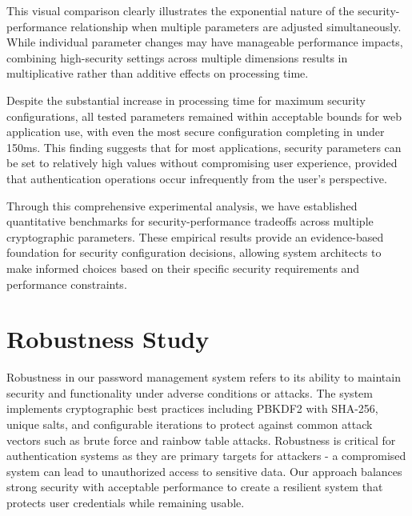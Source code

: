 \documentclass[11pt,a4paper]{article}
\begin{document}
This visual comparison clearly illustrates the exponential nature of the security-performance relationship when multiple parameters are adjusted simultaneously. While individual parameter changes may have manageable performance impacts, combining high-security settings across multiple dimensions results in multiplicative rather than additive effects on processing time.

Despite the substantial increase in processing time for maximum security configurations, all tested parameters remained within acceptable bounds for web application use, with even the most secure configuration completing in under 150ms. This finding suggests that for most applications, security parameters can be set to relatively high values without compromising user experience, provided that authentication operations occur infrequently from the user's perspective.

Through this comprehensive experimental analysis, we have established quantitative benchmarks for security-performance tradeoffs across multiple cryptographic parameters. These empirical results provide an evidence-based foundation for security configuration decisions, allowing system architects to make informed choices based on their specific security requirements and performance constraints.

\section{Robustness Study}

Robustness in our password management system refers to its ability to maintain security and functionality under adverse conditions or attacks. The system implements cryptographic best practices including PBKDF2 with SHA-256, unique salts, and configurable iterations to protect against common attack vectors such as brute force and rainbow table attacks. Robustness is critical for authentication systems as they are primary targets for attackers - a compromised system can lead to unauthorized access to sensitive data. Our approach balances strong security with acceptable performance to create a resilient system that protects user credentials while remaining usable.
\end{document}
